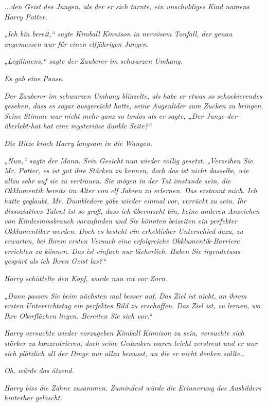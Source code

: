 {\emph{...den Geist des Jungen, als der er sich tarnte, ein unschuldiges Kind namens Harry Potter.}

\emph{„Ich bin bereit,“ sagte Kimball Kinnison in nervösem Tonfall, der genau angemessen war für einen elfjährigen Jungen.}

\emph{„\emph{Legilimens,}“ sagte der Zauberer im schwarzen Umhang.}

\emph{Es gab eine Pause.}

\emph{Der Zauberer im schwarzen Umhang blinzelte, als habe er etwas so} \emph{schockierendes gesehen, dass es sogar ausgereicht hatte,} \emph{\emph{seine}} \emph{Augenlider zum Zucken zu bringen. Seine Stimme war nicht mehr ganz so tonlos als er sagte, „Der Junge-der-überlebt-hat hat eine} \emph{\emph{mysteriöse dunkle Seite?}“}

\emph{Die Hitze kroch Harry langsam in die Wangen.}

\emph{„Nun,“ sagte der Mann. Sein Gesicht nun wieder völlig gesetzt. „Verzeihen Sie. Mr. Potter, es ist gut ihre Stärken zu kennen, doch das ist nicht dasselbe, wie} \emph{allzu sehr auf sie zu vertrauen. Sie mögen in der Tat imstande sein, die Okklumentik bereits im Alter von elf Jahren zu erlernen. Das erstaunt mich. Ich hatte geglaubt, Mr. Dumbledore gäbe wieder einmal vor, verrückt zu sein. Ihr dissoziatives Talent ist so groß, dass ich überrascht bin, keine anderen Anzeichen von Kindesmissbrauch vorzufinden und Sie könnten beizeiten ein perfekter Okklumentiker werden. Doch es besteht ein erheblicher Unterschied} \emph{dazu,} \emph{zu erwarten, bei Ihrem ersten Versuch eine erfolgreiche Okklumentik-Barriere errichten zu können. Das ist einfach nur lächerlich. Haben Sie irgendetwas gespürt als ich Ihren Geist las?“}

\emph{Harry schüttelte den Kopf, wurde nun rot vor Zorn.}

\emph{„Dann passen Sie beim nächsten mal besser auf. Das Ziel ist nicht, an ihrem ersten Unterrichtstag ein perfektes Bild zu erschaffen. Das Ziel ist, zu lernen, wo Ihre Oberflächen liegen. Bereiten Sie sich vor.“}

\emph{Harry versuchte wieder vorzugeben Kimball Kinnison zu sein, versuchte sich stärker zu konzentrieren, doch seine Gedanken waren leicht zerstreut und er war sich plötzlich all der Dinge nur allzu bewusst, an die er nicht denken sollte…}

\emph{Oh,} \emph{würde das ätzend.}

\emph{Harry biss die Zähne zusammen. Zumindest würde die Erinnerung des Ausbilders hinterher gelöscht.}

}
